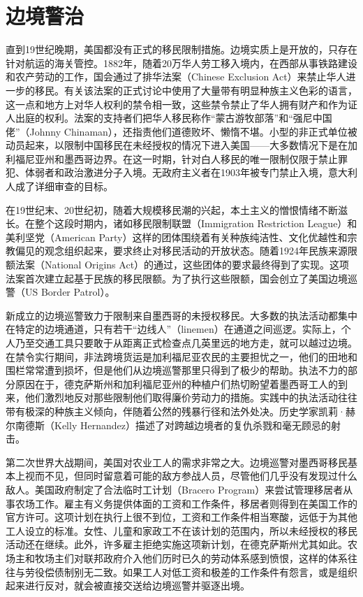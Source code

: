 \documentclass[fontset=fandol, a4paper, 12pt, openright]{ctexbook}
\begin{document}
\chapter{边境警治}

直到19世纪晚期，美国都没有正式的移民限制措施。边境实质上是开放的，只存在针对航运的海关管控。1882年，随着20万华人劳工移入境内，在西部从事铁路建设和农产劳动的工作，国会通过了排华法案（Chinese Exclusion Act）来禁止华人进一步的移民。有关该法案的正式讨论中使用了大量带有明显种族主义色彩的语言，这一点和地方上对华人权利的禁令相一致，这些禁令禁止了华人拥有财产和作为证人出庭的权利。法案的支持者们把华人移民称作“蒙古游牧部落”和“强尼中国佬”（Johnny Chinaman），还指责他们道德败坏、懒惰不堪。小型的非正式单位被动员起来，以限制中国移民在未经授权的情况下进入美国——大多数情况下是在加利福尼亚州和墨西哥边界。在这一时期，针对白人移民的唯一限制仅限于禁止罪犯、体弱者和政治激进分子入境。无政府主义者在1903年被专门禁止入境，意大利人成了详细审查的目标。

在19世纪末、20世纪初，随着大规模移民潮的兴起，本土主义的憎恨情绪不断滋长。在整个这段时期内，诸如移民限制联盟（Immigration Restriction League）和美利坚党（American Party）这样的团体围绕着有关种族纯洁性、文化优越性和宗教偏见的观念组织起来，要求终止对移民活动的开放状态。随着1924年民族来源限额法案（National Origins Act）的通过，这些团体的要求最终得到了实现。这项法案首次建立起基于民族的移民限额。为了执行这些限额，国会创立了美国边境巡警（US Border Patrol）。

新成立的边境巡警致力于限制来自墨西哥的未授权移民。大多数的执法活动都集中在特定的边境通道，只有若干“边线人”（linemen）在通道之间巡逻。实际上，个人乃至交通工具只要敢于从距离正式检查点几英里远的地方走，就可以越过边境。在禁令实行期间，非法跨境货运是加利福尼亚农民的主要担忧之一，他们的田地和围栏常常遭到损坏，但是他们从边境巡警那里只得到了极少的帮助。执法不力的部分原因在于，德克萨斯州和加利福尼亚州的种植户们热切盼望着墨西哥工人的到来，他们激烈地反对那些限制他们取得廉价劳动力的措施。实践中的执法活动往往带有极深的种族主义倾向，伴随着公然的残暴行径和法外处决。历史学家凯莉·赫尔南德斯（Kelly Hernandez）描述了对跨越边境者的复仇杀戮和毫无顾忌的射击。

第二次世界大战期间，美国对农业工人的需求非常之大。边境巡警对墨西哥移民基本上视而不见，但同时留意着可能的敌方参战人员，尽管他们几乎没有发现过什么敌人。美国政府制定了合法临时工计划（Bracero Program）来尝试管理移居者从事农场工作。雇主有义务提供体面的工资和工作条件，移居者则得到在美国工作的官方许可。这项计划在执行上很不到位，工资和工作条件相当寒酸，远低于为其他工人设立的标准。女性、儿童和家政工不在该计划的范围内，所以未经授权的移民活动还在继续。此外，许多雇主拒绝实施这项新计划，在德克萨斯州尤其如此。农场主和牧场主们对联邦政府介入他们历时已久的劳动体系感到愤恨，这样的体系往往与劳役偿债制别无二致。如果工人对低工资和极差的工作条件有怨言，或是组织起来进行反对，就会被直接交送给边境巡警并驱逐出境。
\end{document}
